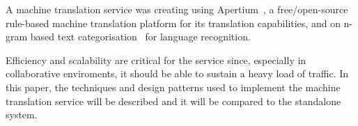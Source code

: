 \documentclass[11pt]{article}
\begin{document}
A machine translation service was creating using Apertium~\citep{armentano05p}, 
a free/open-source rule-based machine translation platform for its translation 
capabilities, and on n-gram based text categorisation~\citep{textcat} for language 
recognition. 





Efficiency and scalability are critical for the service since, especially in collaborative 
enviroments, it should be able to sustain a heavy load of traffic. In this paper, the 
techniques and design patterns used to implement the machine translation service will
be described and it will be compared to the standalone system.

\end{document}
